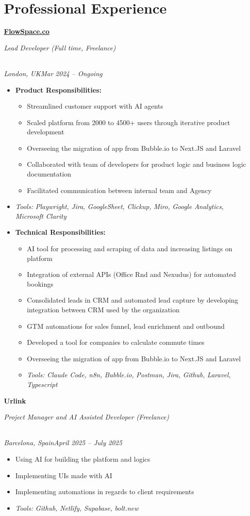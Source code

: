 \documentclass[a4paper,10pt]{article}
\newcommand{\role}[4]{\vspace{3pt}\noindent\hspace{0.6em}\parbox[t]{0.38\textwidth}{\raggedright\textbf{#1}}\hfill\parbox[t]{0.58\textwidth}{\raggedleft\textit{#2}}\\{\textit{#3}\hfill\textit{#4}}\vspace{1pt}}
\begin{document}
\section{Professional Experience}
\role{\href{https://flowspace.co}{FlowSpace.co}}{Lead Developer (Full time, Freelance)}{London, UK}{Mar 2024 -- Ongoing}
\begin{itemize}
\item \textbf{Product Responsibilities:}
\begin{itemize}[label=--]
\item Streamlined customer support with AI agents
\item Scaled platform from 2000 to 4500+ users through iterative product development
\item Overseeing the migration of app from Bubble.io to Next.JS and Laravel
\item Collaborated with team of developers for product logic and business logic documentation
\item Facilitated communication between internal team and Agency
\end{itemize}
\item \textit{Tools: Playwright, Jira, GoogleSheet, Clickup, Miro, Google Analytics, Microsoft Clarity}
\item \textbf{Technical Responsibilities:}
\begin{itemize}[label=--]
\item AI tool for processing and scraping of data and increasing listings on platform
\item Integration of external APIs (Office Rnd and Nexudus) for automated bookings
\item Consolidated leads in CRM and automated lead capture by developing integration between CRM used by the organization
\item GTM automations for sales funnel, lead enrichment and outbound
\item Developed a tool for companies to calculate commute times
\item Overseeing the migration of app from Bubble.io to Next.JS and Laravel
\item \textit{Tools: Claude Code, n8n, Bubble.io, Postman, Jira, Github, Laravel, Typescript}
\end{itemize}
\end{itemize}

\role{Urlink}{Project Manager and AI Assisted Developer (Freelance)}{Barcelona, Spain}{April 2025 -- July 2025}
\begin{itemize}
\item Using AI for building the platform and logics
\item Implementing UIs made with AI
\item Implementing automations in regards to client requirements
\item \textit{Tools: Github, Netlify, Supabase, bolt.new}
\end{itemize}
\end{document}
